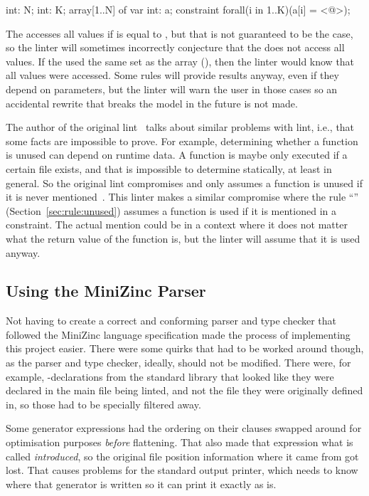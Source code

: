 \documentclass[a4paper,12pt]{article}
\newcommand{\ruleref}[1]{``\nameref{sec:rule:#1}'' (Section~\ref{sec:rule:#1})}
\begin{document}
\begin{mznnobreak}
int: N; int: K;
array[1..N] of var int: a;
constraint forall(i in 1..K)(a[i] = <@\dots@>);
\end{mznnobreak}

The  accesses all values if  is equal to , but that is not
guaranteed to be the case, so the linter will sometimes incorrectly conjecture that the  does not access
all values. If the  used the same set as the array (), then the
linter would know that all values were accessed. Some rules will provide results anyway,
even if they depend on parameters, but the linter will warn the user in those cases so an
accidental rewrite that breaks the model in the future is not made.

The author of the original lint~\cite{lint} talks about similar problems with lint, i.e.,
that some facts are impossible to prove. For example, determining whether a function is
unused can depend on runtime data. A function is maybe only executed if a certain file
exists, and that is impossible to determine statically, at least in general. So the original
lint compromises and only assumes a function is unused if it is never
mentioned~\cite{lint}. This linter makes a similar compromise where the rule
\ruleref{unused} assumes a function is used if it is mentioned in a constraint. The actual
mention could be in a context where it does not matter what the return value of the function is,
but the linter will assume that it is used anyway.

\subsection{Using the MiniZinc Parser}\label{sec:discussion:parser}
Not having to create a correct and conforming parser and type checker that followed the
MiniZinc language specification made the process of implementing this project easier.
There were some quirks that had to be worked around though, as the parser and type
checker, ideally, should not be modified. There were, for example, -declarations
from the standard library that looked like they were declared in the main file being
linted, and not the file they were originally defined in, so those had to be specially
filtered away.

Some generator expressions had the ordering on their  clauses swapped around for
optimisation purposes \emph{before} flattening. That also made that expression what is called \emph{introduced},
so the original file position information where it came from got lost. That causes
problems for the standard output printer, which needs to know where that generator is written
so it can print it exactly as is.
\end{document}
